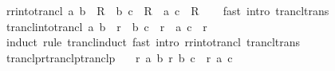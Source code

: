 \begin{isabellebody}
\ r{\isacharunderscore}{\kern0pt}r{\isacharunderscore}{\kern0pt}into{\isacharunderscore}{\kern0pt}trancl{\isacharcolon}{\kern0pt}\ {\isachardoublequoteopen}{\isacharparenleft}{\kern0pt}a{\isacharcomma}{\kern0pt}\ b{\isacharparenright}{\kern0pt}\ {\isasymin}\ R\ {\isasymLongrightarrow}\ {\isacharparenleft}{\kern0pt}b{\isacharcomma}{\kern0pt}\ c{\isacharparenright}{\kern0pt}\ {\isasymin}\ R\ {\isasymLongrightarrow}\ {\isacharparenleft}{\kern0pt}a{\isacharcomma}{\kern0pt}\ c{\isacharparenright}{\kern0pt}\ {\isasymin}\ R\isactrlsup {\isacharplus}{\kern0pt}{\isachardoublequoteclose}\isanewline
%
\isadelimproof
\ \ %
\endisadelimproof
%
\isatagproof
{}\isamarkupfalse%
\ {\isacharparenleft}{\kern0pt}fast\ intro{\isacharcolon}{\kern0pt}\ trancl{\isacharunderscore}{\kern0pt}trans{\isacharparenright}{\kern0pt}%
\endisatagproof
{\isafoldproof}%
%
\isadelimproof
\isanewline
%
\endisadelimproof
\isanewline
{}\isamarkupfalse%
\ trancl{\isacharunderscore}{\kern0pt}into{\isacharunderscore}{\kern0pt}trancl{\isacharcolon}{\kern0pt}\ {\isachardoublequoteopen}{\isacharparenleft}{\kern0pt}a{\isacharcomma}{\kern0pt}\ b{\isacharparenright}{\kern0pt}\ {\isasymin}\ r\isactrlsup {\isacharplus}{\kern0pt}\ {\isasymLongrightarrow}\ {\isacharparenleft}{\kern0pt}b{\isacharcomma}{\kern0pt}\ c{\isacharparenright}{\kern0pt}\ {\isasymin}\ r\ {\isasymLongrightarrow}\ {\isacharparenleft}{\kern0pt}a{\isacharcomma}{\kern0pt}\ c{\isacharparenright}{\kern0pt}\ {\isasymin}\ r\isactrlsup {\isacharplus}{\kern0pt}{\isachardoublequoteclose}\isanewline
%
\isadelimproof
\ \ %
\endisadelimproof
%
\isatagproof
{}\isamarkupfalse%
\ {\isacharparenleft}{\kern0pt}induct\ rule{\isacharcolon}{\kern0pt}\ trancl{\isacharunderscore}{\kern0pt}induct{\isacharparenright}{\kern0pt}\ {\isacharparenleft}{\kern0pt}fast\ intro{\isacharcolon}{\kern0pt}\ r{\isacharunderscore}{\kern0pt}r{\isacharunderscore}{\kern0pt}into{\isacharunderscore}{\kern0pt}trancl\ trancl{\isacharunderscore}{\kern0pt}trans{\isacharparenright}{\kern0pt}{\isacharplus}{\kern0pt}%
\endisatagproof
{\isafoldproof}%
%
\isadelimproof
\isanewline
%
\endisadelimproof
\isanewline
{}\isamarkupfalse%
\ tranclp{\isacharunderscore}{\kern0pt}rtranclp{\isacharunderscore}{\kern0pt}tranclp{\isacharcolon}{\kern0pt}\isanewline
\ \ \ {\isachardoublequoteopen}r\isactrlsup {\isacharplus}{\kern0pt}\isactrlsup {\isacharplus}{\kern0pt}\ a\ b{\isachardoublequoteclose}\ {\isachardoublequoteopen}r\isactrlsup {\isacharasterisk}{\kern0pt}\isactrlsup {\isacharasterisk}{\kern0pt}\ b\ c{\isachardoublequoteclose}\ \ {\isachardoublequoteopen}r\isactrlsup {\isacharplus}{\kern0pt}\isactrlsup {\isacharplus}{\kern0pt}\ a\ c{\isachardoublequoteclose}\isanewline

\end{isabellebody}
